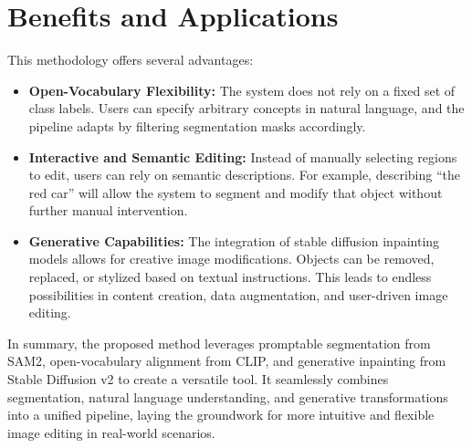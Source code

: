 \section{Benefits and Applications}
This methodology offers several advantages:
\begin{itemize}
    \item \textbf{Open-Vocabulary Flexibility:}  
    The system does not rely on a fixed set of class labels. Users can specify arbitrary concepts in natural language, and the pipeline adapts by filtering segmentation masks accordingly.

    \item \textbf{Interactive and Semantic Editing:}  
    Instead of manually selecting regions to edit, users can rely on semantic descriptions. For example, describing “the red car” will allow the system to segment and modify that object without further manual intervention.

    \item \textbf{Generative Capabilities:}  
    The integration of stable diffusion inpainting models allows for creative image modifications. Objects can be removed, replaced, or stylized based on textual instructions. This leads to endless possibilities in content creation, data augmentation, and user-driven image editing.
\end{itemize}

In summary, the proposed method leverages promptable segmentation from SAM2, open-vocabulary alignment from CLIP, and generative inpainting from Stable Diffusion v2 to create a versatile tool. It seamlessly combines segmentation, natural language understanding, and generative transformations into a unified pipeline, laying the groundwork for more intuitive and flexible image editing in real-world scenarios.
